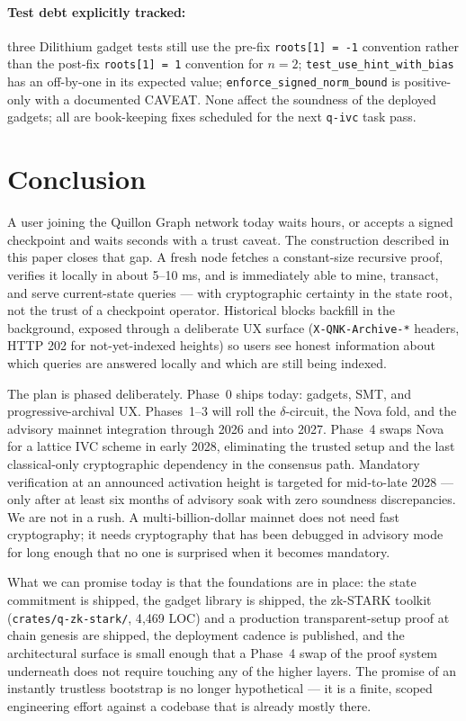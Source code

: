 \documentclass[11pt,a4paper]{article}
\begin{document}
\paragraph{Test debt explicitly tracked:} three Dilithium gadget tests
still use the pre-fix \texttt{roots[1] = -1} convention rather than the
post-fix \texttt{roots[1] = 1} convention for $n = 2$;
\texttt{test\_use\_hint\_with\_bias} has an off-by-one in its
expected value; \texttt{enforce\_signed\_norm\_bound} is positive-only
with a documented CAVEAT. None affect the soundness of the deployed
gadgets; all are book-keeping fixes scheduled for the next
\texttt{q-ivc} task pass.

\section{Conclusion}
\label{sec:conclusion}

A user joining the Quillon Graph network today waits hours, or accepts a
signed checkpoint and waits seconds with a trust caveat. The construction
described in this paper closes that gap. A fresh node fetches a
constant-size recursive proof, verifies it locally in about 5--10 ms,
and is immediately able to mine, transact, and serve current-state
queries --- with cryptographic certainty in the state root, not the
trust of a checkpoint operator. Historical blocks backfill in the
background, exposed through a deliberate UX surface
(\texttt{X-QNK-Archive-*} headers, HTTP 202 for not-yet-indexed
heights) so users see honest information about which queries are
answered locally and which are still being indexed.

The plan is phased deliberately. Phase~0 ships today: gadgets, SMT,
and progressive-archival UX. Phases~1--3 will roll the $\delta$-circuit,
the Nova fold, and the advisory mainnet integration through 2026 and
into 2027. Phase~4 swaps Nova for a lattice IVC scheme in early 2028,
eliminating the trusted setup and the last classical-only cryptographic
dependency in the consensus path. Mandatory verification at an
announced activation height is targeted for mid-to-late 2028 --- only
after at least six months of advisory soak with zero soundness
discrepancies. We are not in a rush. A multi-billion-dollar mainnet
does not need fast cryptography; it needs cryptography that has been
debugged in advisory mode for long enough that no one is surprised
when it becomes mandatory.

What we can promise today is that the foundations are in place: the
state commitment is shipped, the gadget library is shipped, the
zk-STARK toolkit (\texttt{crates/q-zk-stark/}, 4{,}469 LOC) and a
production transparent-setup proof at chain genesis are shipped, the
deployment cadence is published, and the architectural surface is
small enough that a Phase~4 swap of the proof system underneath does
not require touching any of the higher layers. The promise of an
instantly trustless bootstrap is no longer hypothetical --- it is a
finite, scoped engineering effort against a codebase that is already
mostly there.
\end{document}
